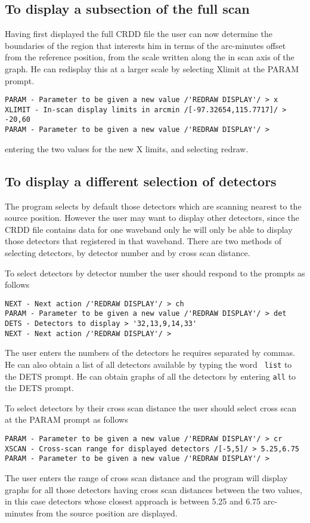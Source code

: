 \subsection{To display a subsection of the full scan}
Having first displayed the full CRDD file the user can now determine the
boundaries of the region that interests him in terms of the arc-minutes offset
from the reference position, from the scale written along the in scan axis of
the graph. He can redisplay this at a larger scale by selecting Xlimit at the
PARAM prompt.
\begin{small}
\begin{verbatim}
PARAM - Parameter to be given a new value /'REDRAW DISPLAY'/ > x
XLIMIT - In-scan display limits in arcmin /[-97.32654,115.7717]/ > -20,60
PARAM - Parameter to be given a new value /'REDRAW DISPLAY'/ > 
\end{verbatim}
\end{small}
entering the two values for the new X limits, and selecting redraw.
\subsection{To display a different selection of detectors}
The program selects by default those detectors which are scanning nearest to 
the source position. However the user may want to display other detectors,
since the CRDD file contains data for one waveband only he will only be able
to display those detectors that registered in that waveband. There are two
methods of selecting detectors, by detector number and by cross scan distance.

To select detectors by detector number the user should respond to the prompts
as follows
\begin{small}
\begin{verbatim}
NEXT - Next action /'REDRAW DISPLAY'/ > ch
PARAM - Parameter to be given a new value /'REDRAW DISPLAY'/ > det
DETS - Detectors to display > '32,13,9,14,33'
NEXT - Next action /'REDRAW DISPLAY'/ > 
\end{verbatim}
\end{small}
The user enters the numbers of the detectors he requires separated by commas.
He can also obtain a list of all detectors available by typing the word {\tt
list} to the DETS prompt. He can obtain graphs of all the detectors by entering
{\tt all} to the DETS prompt.

To select detectors by their cross scan distance the user should select cross
scan at the PARAM prompt as follows
\begin{small}
\begin{verbatim}
PARAM - Parameter to be given a new value /'REDRAW DISPLAY'/ > cr
XSCAN - Cross-scan range for displayed detectors /[-5,5]/ > 5.25,6.75
PARAM - Parameter to be given a new value /'REDRAW DISPLAY'/ > 
\end{verbatim}
\end{small}
The user enters the range of cross scan distance and the program will display
graphs for all those detectors having cross scan distances between the two
values, in this case detectors whose closest approach is between 5.25 and
6.75 arc-minutes from the source position are displayed.
